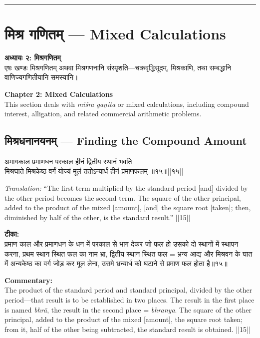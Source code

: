 \documentclass[10pt,a4paper]{article}
\newcommand{\dev}[1]{{\devanagarifont #1}}
\newcommand{\longline}{\noindent\rule{\textwidth}{0.4pt}}
\newcommand{\vnum}[1]{\hfill\textnormal{||#1||}}
\newenvironment{shloka}{%
  \begin{lrbox}{\shlokabox}
  \begin{minipage}{\dimexpr\textwidth-16pt\relax}%
  \devanagarifont\centering\setstretch{1.3}%
}{%
  \end{minipage}%
  \end{lrbox}%
  \par\medskip\noindent\fcolorbox{rulecolor}{versebg}{\usebox{\shlokabox}}\par\medskip
}
\newcommand{\bilingual}[2]{%
  \noindent%
  \begin{minipage}[t]{0.47\textwidth}%
    \setstretch{1.15}#1%
  \end{minipage}%
  \hfill%
  \vrule\hfill%
  \begin{minipage}[t]{0.47\textwidth}%
    \setstretch{1.15}#2%
  \end{minipage}%
  \par\medskip
}
\begin{document}
\vspace{0.5em}
\noindent\longline
\vspace{0.5em}

\section{\dev{मिश्र गणितम्} --- Mixed Calculations}

\bilingual{%
\textbf{अध्यायः २: मिश्रगणितम्}\\[0.3em]
एषः खण्डः मिश्रगणितम् अथवा मिश्रगणनानि संस्पृशति---चक्रवृद्धिसूदम्, मिश्रकाणि, तथा सम्बद्धानि वाणिज्यगणितीयानि समस्यानि।
}{%
\textbf{Chapter 2: Mixed Calculations}\\[0.3em]
This section deals with \textit{miśra gaṇita} or mixed calculations, including compound interest, alligation, and related commercial arithmetic problems.
}

\subsection{\dev{मिश्रधनानयनम्} --- Finding the Compound Amount}

\bilingual{%
\begin{shloka}
अमागकाल प्रमाणधन परकाल हीनं द्वितीय स्थानं भवति\\
मिश्रघाते मिश्रकेष्ठ वर्गं योज्यं मूलं ततोऽन्यार्धं हीनं प्रमाणफलम् ॥१५॥\vnum{१५}
\end{shloka}
}{%
\textit{Translation:} ``The first term multiplied by the standard period [and] divided by the other period becomes the second term. The square of the other principal, added to the product of the mixed [amount], [and] the square root [taken]; then, diminished by half of the other, is the standard result.'' ||15||
}

\bilingual{%
\textbf{टीका:}\\[0.3em]
प्रमाण काल और प्रमाणधन के धन में परकाल से भाग देकर जो फल हो उसको दो स्थानों में स्थापन करना, प्रथम स्थान स्थित फल का नाम भ्रा, द्वितीय स्थान स्थित फल = भ्रन्य आद्य और मिश्रवन के घात में अन्यकेष्ठ का वर्ग जोड़ कर मूल लेना, उसमे भ्रन्यार्ध को घटाने से प्रमाण फल होता है॥१५॥
}{%
\textbf{Commentary:}\\[0.3em]
The product of the standard period and standard principal, divided by the other period---that result is to be established in two places. The result in the first place is named \textit{bhrā}, the result in the second place = \textit{bhranya}. The square of the other principal, added to the product of the mixed [amount], the square root taken; from it, half of the other being subtracted, the standard result is obtained. ||15||
}
\end{document}
